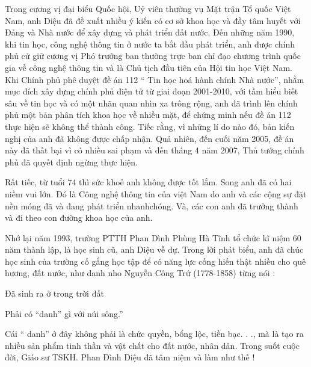Trong cương vị đại biểu Quốc hội, Uỷ viên thường vụ Mặt trận Tổ quốc Việt Nam, anh Diệu đã đề xuất nhiều ý kiến có cơ sở khoa học và đầy tâm huyết với Đảng và Nhà nước để xây dựng và phát triển đất nước. Đến những năm 1990, khi tin học, công nghệ thông tin ở nước ta bắt đầu phát triển, anh được chính phủ cử giữ cương vị Phó trưởng ban thường trực ban chỉ đạo chương trình quốc gia về công nghệ thông tin và là Chủ tịch đầu tiên của Hội tin học Việt Nam. Khi Chính phủ phê duyệt đề án 112 “ Tin học hoá hành chính Nhà nước”, nhằm mục đích xây dựng chính phủ điện tử từ giai đoạn 2001-2010, với tầm hiểu biết sâu về tin học và có một nhãn quan nhìn xa trông rộng, anh đã trình lên chính phủ một bản phân tích khoa học về nhiều mặt, để chứng minh nếu đề án 112 thực hiện sẽ không thể thành công. Tiếc rằng, vì những lí do nào đó, bản kiến nghị của anh đã không được chấp nhận. Quả nhiên, đến cuối năm 2005, đề án này đã thất bại vì có nhiều sai phạm và đến tháng 4 năm 2007, Thủ tướng chính phủ đã quyết định ngừng thực hiện.

Rất tiếc, từ tuổi 74 thì sức khoẻ anh không được tốt lắm. Song anh đã có hai niềm vui lớn. Đó là Công nghệ thông tin của việt Nam do anh và các cộng sự  đặt nền móng đã và đang phát triển nhanhchóng. Và, các con anh đã trưởng thành và đi theo con đường khoa học của anh.

Nhớ lại năm 1993, trường PTTH Phan Dình Phùng Hà Tĩnh tổ chức kĩ niệm 60 năm thành lập, là học sinh cũ, anh Diệu về dự. Trong lời  phát biểu, anh đã chúc học sinh của trường cố gắng học tập để có năng lực cống hiến thật nhiều cho quê hương, đất nước, như danh nho Nguyễn Công Trứ (1778-1858) từng nói :

Đã sinh ra ở trong trời đất

Phải có “danh” gì với núi sông.”

Cái “ danh” ở đây không phải là chức quyền, bổng lộc, tiền bạc. . ., mà là tạo ra nhiều sản phẩm tinh thần và vật chất cho đất nước, nhân dân. Trong suốt cuộc đời, Giáo sư TSKH. Phan Đình Diệu đã tâm niệm và làm như thế !